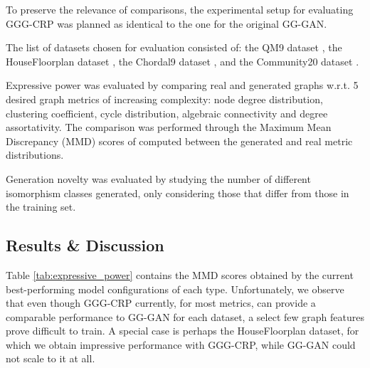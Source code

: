 To preserve the relevance of comparisons, the experimental setup for evaluating GGG-CRP was planned as identical to the one for the original GG-GAN.

The list of datasets chosen for evaluation consisted of: the QM9 dataset \cite{de_cao_molgan_2018}, the HouseFloorplan dataset \cite{nauata_house-gan_2020}, the Chordal9 dataset \cite{mckay_chordal_2020}, and the Community20 dataset \cite{niu_permutation_2020}.

Expressive power was evaluated by comparing real and generated graphs w.r.t. 5 desired graph metrics of increasing complexity: node degree distribution, clustering coefficient, cycle distribution, algebraic connectivity and degree assortativity. The comparison was performed through the Maximum Mean Discrepancy (MMD) scores of \cite{you_graphrnn_2018} computed between the generated and real metric distributions.

Generation novelty was evaluated by studying the number of different isomorphism classes generated, only considering those that differ from those in the training set.

\subsection{Results \& Discussion}
\label{sec:results_gggcrp}

Table \ref{tab:expressive_power} contains the MMD scores obtained by the current best-performing model configurations of each type. Unfortunately, we observe that even though GGG-CRP currently, for most metrics, can provide a comparable performance to GG-GAN for each dataset, a select few graph features prove difficult to train. A special case is perhaps the HouseFloorplan dataset, for which we obtain impressive performance with GGG-CRP, while GG-GAN could not scale to it at all.

